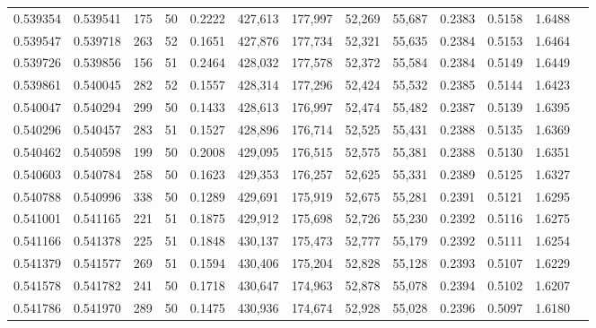 \begin{tabular}{rrrrrrrrrrrrr}
0.539354 & 0.539541 &   175 &  50 &                                     0.2222 & 427,613 & 177,997 &  52,269 &  55,687 & 0.2383 & 0.5158 & 1.6488 \\
0.539547 & 0.539718 &   263 &  52 &                                     0.1651 & 427,876 & 177,734 &  52,321 &  55,635 & 0.2384 & 0.5153 & 1.6464 \\
0.539726 & 0.539856 &   156 &  51 &                                     0.2464 & 428,032 & 177,578 &  52,372 &  55,584 & 0.2384 & 0.5149 & 1.6449 \\
0.539861 & 0.540045 &   282 &  52 &                                     0.1557 & 428,314 & 177,296 &  52,424 &  55,532 & 0.2385 & 0.5144 & 1.6423 \\
0.540047 & 0.540294 &   299 &  50 &                                     0.1433 & 428,613 & 176,997 &  52,474 &  55,482 & 0.2387 & 0.5139 & 1.6395 \\
0.540296 & 0.540457 &   283 &  51 &                                     0.1527 & 428,896 & 176,714 &  52,525 &  55,431 & 0.2388 & 0.5135 & 1.6369 \\
0.540462 & 0.540598 &   199 &  50 &                                     0.2008 & 429,095 & 176,515 &  52,575 &  55,381 & 0.2388 & 0.5130 & 1.6351 \\
0.540603 & 0.540784 &   258 &  50 &                                     0.1623 & 429,353 & 176,257 &  52,625 &  55,331 & 0.2389 & 0.5125 & 1.6327 \\
0.540788 & 0.540996 &   338 &  50 &                                     0.1289 & 429,691 & 175,919 &  52,675 &  55,281 & 0.2391 & 0.5121 & 1.6295 \\
0.541001 & 0.541165 &   221 &  51 &                                     0.1875 & 429,912 & 175,698 &  52,726 &  55,230 & 0.2392 & 0.5116 & 1.6275 \\
0.541166 & 0.541378 &   225 &  51 &                                     0.1848 & 430,137 & 175,473 &  52,777 &  55,179 & 0.2392 & 0.5111 & 1.6254 \\
0.541379 & 0.541577 &   269 &  51 &                                     0.1594 & 430,406 & 175,204 &  52,828 &  55,128 & 0.2393 & 0.5107 & 1.6229 \\
0.541578 & 0.541782 &   241 &  50 &                                     0.1718 & 430,647 & 174,963 &  52,878 &  55,078 & 0.2394 & 0.5102 & 1.6207 \\
0.541786 & 0.541970 &   289 &  50 &                                     0.1475 & 430,936 & 174,674 &  52,928 &  55,028 & 0.2396 & 0.5097 & 1.6180 \\

\end{tabular}
